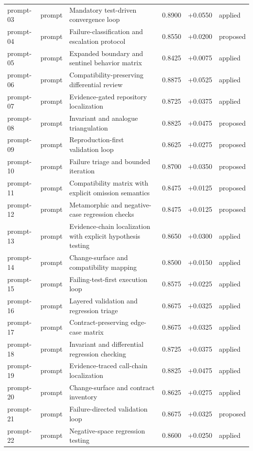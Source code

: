 \begin{center}
\begin{longtable}{llp{5.2cm}rrl}
prompt-03 & prompt & Mandatory test-driven convergence loop & 0.8900 & +0.0550 & applied \\
prompt-04 & prompt & Failure-classification and escalation protocol & 0.8550 & +0.0200 & proposed \\
prompt-05 & prompt & Expanded boundary and sentinel behavior matrix & 0.8425 & +0.0075 & applied \\
prompt-06 & prompt & Compatibility-preserving differential review & 0.8875 & +0.0525 & applied \\
prompt-07 & prompt & Evidence-gated repository localization & 0.8725 & +0.0375 & applied \\
prompt-08 & prompt & Invariant and analogue triangulation & 0.8825 & +0.0475 & proposed \\
prompt-09 & prompt & Reproduction-first validation loop & 0.8625 & +0.0275 & proposed \\
prompt-10 & prompt & Failure triage and bounded iteration & 0.8700 & +0.0350 & proposed \\
prompt-11 & prompt & Compatibility matrix with explicit omission semantics & 0.8475 & +0.0125 & proposed \\
prompt-12 & prompt & Metamorphic and negative-case regression checks & 0.8475 & +0.0125 & proposed \\
prompt-13 & prompt & Evidence-chain localization with explicit hypothesis testing & 0.8650 & +0.0300 & applied \\
prompt-14 & prompt & Change-surface and compatibility mapping & 0.8500 & +0.0150 & applied \\
prompt-15 & prompt & Failing-test-first execution loop & 0.8575 & +0.0225 & applied \\
prompt-16 & prompt & Layered validation and regression triage & 0.8675 & +0.0325 & applied \\
prompt-17 & prompt & Contract-preserving edge-case matrix & 0.8675 & +0.0325 & applied \\
prompt-18 & prompt & Invariant and differential regression checking & 0.8725 & +0.0375 & applied \\
prompt-19 & prompt & Evidence-traced call-chain localization & 0.8825 & +0.0475 & applied \\
prompt-20 & prompt & Change-surface and contract inventory & 0.8625 & +0.0275 & applied \\
prompt-21 & prompt & Failure-directed validation loop & 0.8675 & +0.0325 & proposed \\
prompt-22 & prompt & Negative-space regression testing & 0.8600 & +0.0250 & applied \\

\end{longtable}
\end{center}
